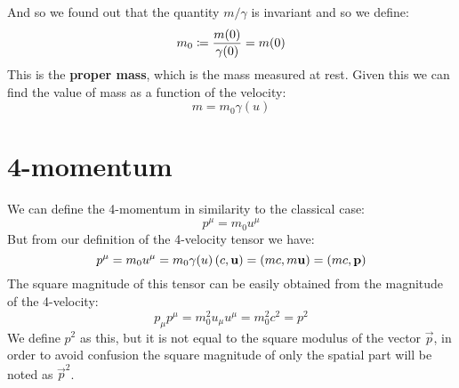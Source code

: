 And so we found out that the quantity $m/ \gamma$ is invariant and so we define:
\begin{equation}
  m_0 \coloneqq \dfrac{m(0)}{\gamma(0)} = m(0)
\end{equation}
This is the \textbf{proper mass}, which is the mass measured at rest. Given this we can find the value of mass as a function of the velocity:
\begin{equation}
  m = m_0\gamma(u)
\end{equation}
\section{4-momentum}
We can define the 4-momentum in similarity to the classical case:
\begin{equation}
  p^{\mu} = m_0 u^{\mu}
\end{equation}
But from our definition of the 4-velocity tensor we have:
\begin{equation}
  p^{\mu} = m_0 u^{\mu} = m_0 \gamma(u)\left(c, \vb{u}\right) = \left(mc, m\vb{u}\right) = \left(mc, \vb{p}\right)
\end{equation}
The square magnitude of this tensor can be easily obtained from the magnitude of the 4-velocity:
\begin{equation}
  p_{\mu}p^{\mu} = m_0^2u_{\mu}u^{\mu} = m_0^2c^2 = p^2
\end{equation}
We define $p^2$ as this, but it is not equal to the square modulus of the vector $\vec{p}$, in order to avoid confusion the square magnitude of only the spatial part will be noted as $\vec{p}^2$.
